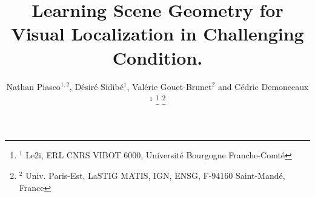 \documentclass[letterpaper, 10 pt, conference]{ieeeconf}  %
\title{\LARGE \bf
Learning Scene Geometry for \\
Visual Localization in Challenging Condition.
}
\author{Nathan Piasco${}^{1,2}$, D\'esir\'e Sidib\'e${}^1$, Val\'erie Gouet-Brunet${}^2$ and C\'edric Demonceaux${}^1$%
\thanks{${}^1$ Le2i, ERL CNRS VIBOT 6000,  Universit\'e  Bourgogne Franche-Comt\'e}%
\thanks{${}^2$ Univ. Paris-Est, LaSTIG MATIS, IGN, ENSG, F-94160 Saint-Mand\'e, France}%
}
\begin{document}
\newcommand{\norm}[1]{\left\lVert#1\right\rVert}
\newcommand\numberthis{\addtocounter{equation}{1}\tag{\theequation}}

\maketitle
\thispagestyle{empty}
\pagestyle{empty}


\begin{abstract}

\end{abstract}










\end{document}

